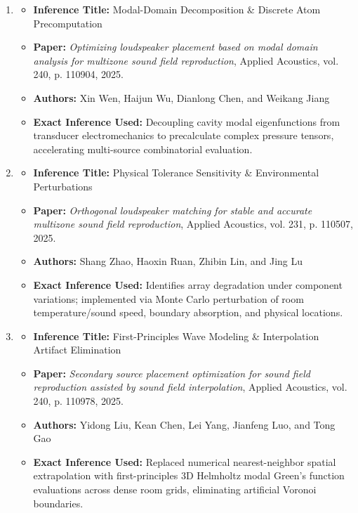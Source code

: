 \documentclass[11pt,a4paper]{article}
\begin{document}
\begin{enumerate}
    \item 
    \begin{itemize}
        \item \textbf{Inference Title:} Modal-Domain Decomposition \& Discrete Atom Precomputation
        \item \textbf{Paper:} \textit{Optimizing loudspeaker placement based on modal domain analysis for multizone sound field reproduction}, Applied Acoustics, vol. 240, p. 110904, 2025.
        \item \textbf{Authors:} Xin Wen, Haijun Wu, Dianlong Chen, and Weikang Jiang
        \item \textbf{Exact Inference Used:} Decoupling cavity modal eigenfunctions from transducer electromechanics to precalculate complex pressure tensors, accelerating multi-source combinatorial evaluation.
    \end{itemize}

    \item 
    \begin{itemize}
        \item \textbf{Inference Title:} Physical Tolerance Sensitivity \& Environmental Perturbations
        \item \textbf{Paper:} \textit{Orthogonal loudspeaker matching for stable and accurate multizone sound field reproduction}, Applied Acoustics, vol. 231, p. 110507, 2025.
        \item \textbf{Authors:} Shang Zhao, Haoxin Ruan, Zhibin Lin, and Jing Lu
        \item \textbf{Exact Inference Used:} Identifies array degradation under component variations; implemented via Monte Carlo perturbation of room temperature/sound speed, boundary absorption, and physical locations.
    \end{itemize}

    \item 
    \begin{itemize}
        \item \textbf{Inference Title:} First-Principles Wave Modeling \& Interpolation Artifact Elimination
        \item \textbf{Paper:} \textit{Secondary source placement optimization for sound field reproduction assisted by sound field interpolation}, Applied Acoustics, vol. 240, p. 110978, 2025.
        \item \textbf{Authors:} Yidong Liu, Kean Chen, Lei Yang, Jianfeng Luo, and Tong Gao
        \item \textbf{Exact Inference Used:} Replaced numerical nearest-neighbor spatial extrapolation with first-principles 3D Helmholtz modal Green's function evaluations across dense room grids, eliminating artificial Voronoi boundaries.
    \end{itemize}


\end{enumerate}
\end{document}
